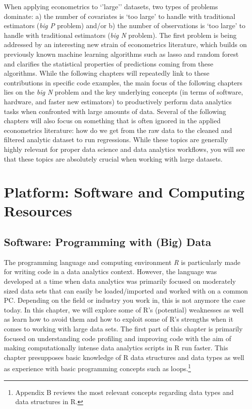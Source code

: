 \documentclass[
  12pt,
]{style/krantz}
\begin{document}
When applying econometrics to `'large'' datasets, two types of problems dominate: a) the number of covariates is `too large' to handle with traditional estimators (\emph{big P} problem) and/or b) the number of observations is `too large' to handle with traditional estimators (\emph{big N} problem). The first problem is being addressed by an interesting new strain of econometrics literature, which builds on previously known machine learning algorithms such as lasso and random forest and clarifies the statistical properties of predictions coming from these algorithms. While the following chapters will repeatedly link to these contributions in specific code examples, the main focus of the following chapters lies on the \emph{big N} problem and the key underlying concepts (in terms of software, hardware, and faster new estimators) to productively perform data analytics tasks when confronted with large amounts of data. Several of the following chapters will also focus on something that is often ignored in the applied econometrics literature: how do we get from the raw data to the cleaned and filtered analytic dataset to run regressions. While these topics are generally highly relevant for proper data science and data analytics workflows, you will see that these topics are absolutely crucial when working with large datasets.

\hypertarget{part-platform-software-and-computing-resources}{%
\part{Platform: Software and Computing Resources}\label{part-platform-software-and-computing-resources}}

\hypertarget{software-programming-with-big-data}{%
\chapter{Software: Programming with (Big) Data}\label{software-programming-with-big-data}}

The programming language and computing environment \emph{R} is particularly made for writing code in a data analytics context. However, the language was developed at a time when data analytics was primarily focused on moderately sized data sets that can easily be loaded/imported and worked with on a common PC. Depending on the field or industry you work in, this is not anymore the case today. In this chapter, we will explore some of R's (potential) weaknesses as well as learn how to avoid them and how to exploit some of R's strengths when it comes to working with large data sets. The first part of this chapter is primarily focused on understanding code profiling and improving code with the aim of making computationally intense data analytics scripts in R run faster. This chapter presupposes basic knowledge of R data structures and data types as well as experience with basic programming concepts such as loops.\footnote{Appendix B reviews the most relevant concepts regarding data types and data structures in R.}
\end{document}
